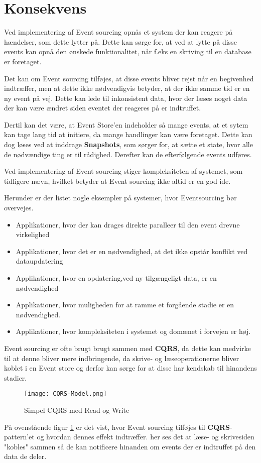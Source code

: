 \section{Konsekvens}
Ved implementering af Event sourcing opnås et system der kan reagere på hændelser, som dette lytter på. Dette kan sørge for, at ved at lytte på disse events kan opnå den ønskede funktionalitet, når f.eks en skriving til en database er foretaget.

Det kan om Event sourcing tilføjes, at disse events bliver rejst når en begivenhed indtræffer, men at dette ikke nødvendigvis betyder, at der ikke samme tid er en ny event på vej. Dette kan lede til inkonsistent data, hvor der læses noget data der kan være ændret siden eventet der reageres på er indtruffet.

Dertil kan det være, at Event Store'en indeholder så mange events, at et sytem kan tage lang tid at initiere, da mange handlinger kan være foretaget. Dette kan dog løses ved at inddrage \textbf{Snapshots}, som sørger for, at sætte et state, hvor alle de nødvændige ting er til rådighed. Derefter kan de efterfølgende events udføres.

Ved implementering af Event sourcing stiger kompleksiteten af systemet, som tidligere nævn, hvilket betyder at Event sourcing ikke altid er en god ide. 

Herunder er der listet nogle eksempler på systemer, hvor Eventsourcing bør overvejes.
\begin{itemize}
	\item Applikationer, hvor der kan drages direkte paralleer til den event drevne virkelighed
	\item Applikationer, hvor det er en nødvendighed, at det ikke opstår konflikt ved dataupdatering 
	\item Applikationer, hvor en opdatering,ved ny tilgængeligt data, er en nødvendighed
	\item Applikationer, hvor muligheden for at ramme et forgående stadie er en nødvendighed.
	\item Applikationer, hvor kompleksiteten i systemet og domænet i forvejen er høj.
\end{itemize}

Event sourcing er ofte brugt brugt sammen med \textbf{CQRS}, da dette kan medvirke til at denne  bliver mere indbringende, da skrive- og læseoperationerne bliver koblet i en Event store og derfor kan sørge for at disse har kendskab til hinandens stadier.

\begin{figure}[H]
	\center
	\texttt{[image: CQRS-Model.png]}
	\caption{Simpel CQRS med Read og Write}
	\label{fig:cqrs-ES_model}
\end{figure}

På ovenstående figur \ref{fig:cqrs-ES_model} er det vist, hvor Event sourcing tilføjes til \textbf{CQRS}-pattern'et og hvordan dennes effekt indtræffer. her ses det at læse- og skrivesiden "kobles" sammen så de kan notificere hinanden om events der er indtruffet på den data de deler. 